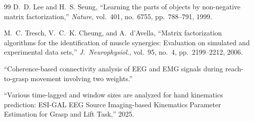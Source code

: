 \documentclass[12pt, a4paper]{article}
\begin{document}
\begin{thebibliography}{99}
		D.~D. Lee and H.~S. Seung,
		``Learning the parts of objects by non-negative matrix factorization,''
		\textit{Nature}, vol.~401, no.~6755, pp.~788--791, 1999.
		
		M.~C. Tresch, V.~C.~K. Cheung, and A.~d'Avella,
		``Matrix factorization algorithms for the identification of muscle
		synergies: Evaluation on simulated and experimental data sets,''
		\textit{J.\ Neurophysiol.}, vol.~95, no.~4, pp.~2199--2212, 2006.
		
		``Coherence-based connectivity analysis of EEG and EMG signals during reach-to-grasp movement involving two weights.''
		
		``Various time-lagged and window sizes are analyzed for hand kinematics prediction: ESI-GAL EEG Source Imaging-based Kinematics Parameter Estimation for Grasp and Lift Task,'' 2025.
		
	\end{thebibliography}
	
\end{document}
